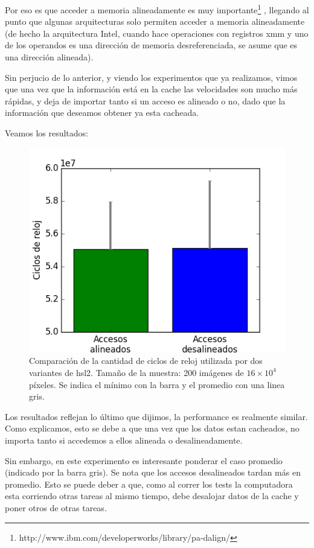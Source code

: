 Por eso es que acceder a memoria alineadamente es muy importante\footnote{http://www.ibm.com/developerworks/library/pa-dalign/} , llegando al punto que algunas arquitecturas solo permiten acceder a memoria alineadamente (de hecho la arquitectura Intel, cuando hace operaciones con registros xmm y uno de los operandos es una dirección de memoria desreferenciada, se asume que es una dirección alineada).

Sin perjucio de lo anterior, y viendo los experimentos que ya realizamos, vimos que una vez que la información está en la cache las velocidades son mucho más rápidas, y deja de importar tanto si un acceso es alineado o no, dado que la información que deseamos obtener ya esta cacheada.

Veamos los resultados:

\begin{figure}[H] 
	\centering
  \includegraphics[scale=0.7]{images/hsl-alineamiento.png}
  \caption{Comparación de la cantidad de ciclos de reloj utilizada por dos variantes de hsl2. Tamaño de la muestra: 200 imágenes de $16 \times 10^4$ píxeles. Se indica el mínimo con la barra y el promedio con una linea gris.}
\end{figure}

Los resultados reflejan lo último que dijimos, la performance es realmente similar. Como explicamos, esto se debe a que una vez que los datos estan cacheados, no importa tanto si accedemos a ellos alineada o desalineadamente.

Sin embargo, en este experimento es interesante ponderar el caso promedio (indicado por la barra gris). Se nota que los accesos desalineados tardan más en promedio. Esto se puede deber a que, como al correr los tests la computadora esta corriendo otras tareas al mismo tiempo, debe desalojar datos de la cache y poner otros de otras tareas.

